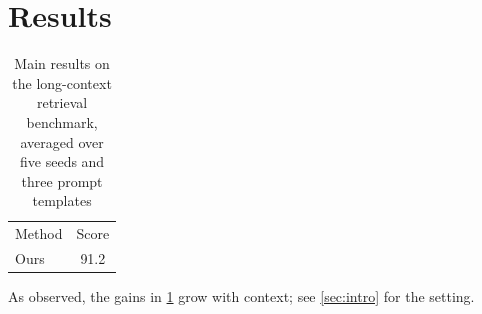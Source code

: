 \section{Results}\label{sec:results}
\begin{table}[t]
  \centering
  \caption{Main results on the long-context retrieval benchmark, averaged over five seeds and three prompt templates}
  \label{tab:main}
  \begin{tabular}{lc}
    Method & Score \\
    Ours & 91.2
  \end{tabular}
\end{table}
As \citet{vaswani2017attention} observed, the gains in \cref{tab:main} grow with context; see \cref{sec:intro} for the setting.
